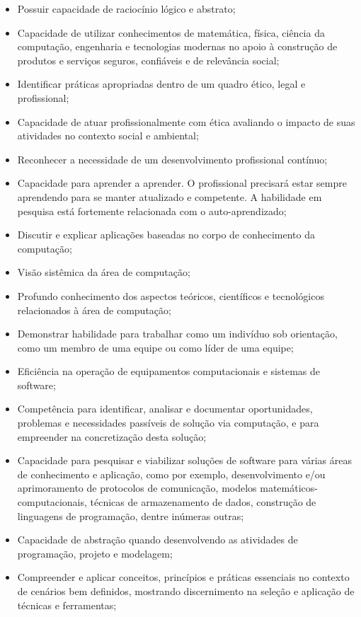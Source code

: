 \documentclass[
	12pt,				%
	openright,			%
  oneside,     %
	a4paper,			%
 hyphens,
	chapter=TITLE,		%
	english,			%
	french,				%
	spanish,			%
	brazil				%
	]{abntex2}
\begin{document}
\begin{itemize}
    \item Possuir capacidade de raciocínio lógico e abstrato;
    \item Capacidade de utilizar conhecimentos de matemática, física, ciência da computação, engenharia e tecnologias modernas no apoio à construção de produtos e serviços seguros, confiáveis e de relevância social;
    \item Identificar práticas apropriadas dentro de um quadro ético, legal e profissional;
    \item Capacidade de atuar profissionalmente com ética avaliando o impacto de suas atividades no contexto social e ambiental;
    \item Reconhecer a necessidade de um desenvolvimento profissional contínuo;
    \item Capacidade para aprender a aprender. O profissional precisará estar sempre aprendendo para se manter atualizado e competente. A habilidade em pesquisa está fortemente relacionada com o auto-aprendizado;
    \item Discutir e explicar aplicações baseadas no corpo de conhecimento da computação;
    \item Visão sistêmica da área de computação;
    \item Profundo conhecimento dos aspectos teóricos, científicos e tecnológicos relacionados à área de computação;
    \item Demonstrar habilidade para trabalhar como um indivíduo sob orientação, como um membro de uma equipe ou como líder de uma equipe;
    \item Eficiência na operação de equipamentos computacionais e sistemas de software;
    \item Competência para identificar, analisar e documentar oportunidades, problemas e necessidades passíveis de solução via computação, e para empreender na concretização desta solução;
    \item Capacidade para pesquisar e viabilizar soluções de software para várias áreas de conhecimento e aplicação, como por exemplo, desenvolvimento e/ou aprimoramento de protocolos de comunicação, modelos matemáticos-computacionais, técnicas de armazenamento de dados, construção de linguagens de programação, dentre inúmeras outras;
    \item Capacidade de abstração quando desenvolvendo as atividades de programação, projeto e modelagem;
    \item Compreender e aplicar conceitos, princípios e práticas essenciais no contexto de cenários bem definidos, mostrando discernimento na seleção e aplicação de técnicas e ferramentas;

\end{itemize}
\end{document}

